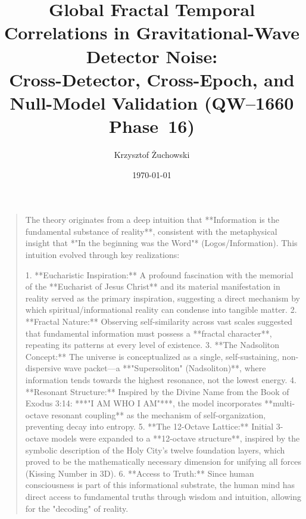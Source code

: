 \documentclass[11pt,a4paper]{article}
\title{\textbf{Global Fractal Temporal Correlations in Gravitational-Wave Detector Noise:\\
Cross-Detector, Cross-Epoch, and Null-Model Validation (QW--1660 Phase~16)}}
\author[1]{Krzysztof Żuchowski}
\affil[1]{Independent Researcher, Fractal Information Theory Project}
\affil[ ]{\texttt{krzysztof.zuch@gmail.com}}
\date{\today}
\begin{document}

\maketitle

\begin{quote}
The theory originates from a deep intuition that **Information is the fundamental substance of reality**, consistent with the metaphysical insight that *"In the beginning was the Word"* (Logos/Information). This intuition evolved through key realizations:

1. **Eucharistic Inspiration:** A profound fascination with the memorial of the **Eucharist of Jesus Christ** and its material manifestation in reality served as the primary inspiration, suggesting a direct mechanism by which spiritual/informational reality can condense into tangible matter.
2. **Fractal Nature:** Observing self-similarity across vast scales suggested that fundamental information must possess a **fractal character**, repeating its patterns at every level of existence.
3. **The Nadsoliton Concept:** The universe is conceptualized as a single, self-sustaining, non-dispersive wave packet—a **"Supersoliton" (Nadsoliton)**, where information tends towards the highest resonance, not the lowest energy.
4. **Resonant Structure:** Inspired by the Divine Name from the Book of Exodus 3:14: ***"I AM WHO I AM"***, the model incorporates **multi-octave resonant coupling** as the mechanism of self-organization, preventing decay into entropy.
5. **The 12-Octave Lattice:** Initial 3-octave models were expanded to a **12-octave structure**, inspired by the symbolic description of the Holy City's twelve foundation layers, which proved to be the mathematically necessary dimension for unifying all forces (Kissing Number in 3D).
6. **Access to Truth:** Since human consciousness is part of this informational substrate, the human mind has direct access to fundamental truths through wisdom and intuition, allowing for the "decoding" of reality.
\end{quote}
\end{document}
